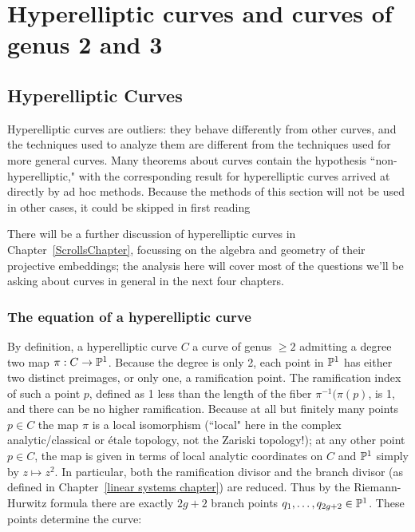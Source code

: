 

\chapter{Hyperelliptic curves and curves of genus 2 and 3}\label{genus 2 and 3 chapter}

\section{Hyperelliptic Curves}\label{hyperelliptic}
 
 
Hyperelliptic curves are outliers: they behave differently from other curves, and the techniques used to analyze them are different from the techniques used for more general curves. Many theorems about curves contain the hypothesis ``non-hyperelliptic," with the corresponding result for hyperelliptic curves arrived at directly by ad hoc methods. Because the methods of this section will not be used in other cases, it could be skipped in first reading
 
There will be a further discussion of hyperelliptic curves in Chapter~\ref{ScrollsChapter}, focussing on the algebra and geometry of their projective embeddings; the analysis here will cover most of the questions we'll be asking about curves in general in the next four chapters. 
  
 \subsection{The equation of a hyperelliptic curve}
 
By definition, a hyperelliptic curve $C$ a curve of genus $\geq 2$ admitting a degree two map $\pi : C \to \PP^1$. Because the degree is only 2, each point in $\PP^1$ has either two distinct preimages, or only one, a ramification point. 
The ramification index of such a point $p$, defined as 1 less than the length of the fiber $\pi^{-1}(\pi(p)$, is 1, and there can be no higher ramification. Because at all but finitely many points $p \in C$ the map $\pi$ is a local isomorphism (``local" here in the complex analytic/classical or \'etale topology, not the Zariski topology!); at any other point $p \in C$, the map is given in terms of local analytic coordinates on $C$ and $\PP^1$ simply by $z \mapsto z^2$. In particular, both the ramification divisor and the branch divisor (as defined in Chapter~\ref{linear systems chapter}) are reduced. Thus by the Riemann-Hurwitz formula there are exactly $2g+2$ branch points $q_1,\dots,q_{2g+2} \in \PP^1$. These points determine the curve:
  
